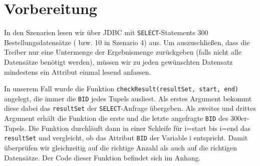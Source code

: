 \chapter{Vorbereitung}
In den Szenarien lesen wir über JDBC mit \texttt{SELECT}-Statements 300 Bestellungsdatensätze ( bzw. 10 in Szenario 4) aus. Um auszuschließen, dass die Treiber nur eine Untermenge der Ergebnismenge zurückgeben (falls nicht alle Datensätze benötigt werden), müssen wir zu jeden gewünschten Datensatz mindestens ein Attribut einmal lesend anfassen. 

In unserem Fall wurde die Funktion \texttt{checkResult(resultSet, start, end)} angelegt, die immer die \texttt{BID} jedes Tupels ausliest. Als erstes Argument bekommt diese dabei das \texttt{resultSet} der \texttt{SELECT}-Anfrage übergeben. Als zweites und drittes Argument erhält die Funktion die erste und die letzte angefragte \texttt{BID} des 300er-Tupels. Die Funktion durchläuft dann in einer Schleife für i=start bis i=end das \texttt{resultSet} und vergleicht, ob das Attribut \texttt{BID} der Variable i entspricht. Damit überprüfen wir gleichzeitig auf die richtige Anzahl als auch auf die richtigen Datensätze. Der Code dieser Funktion befindet sich im Anhang.